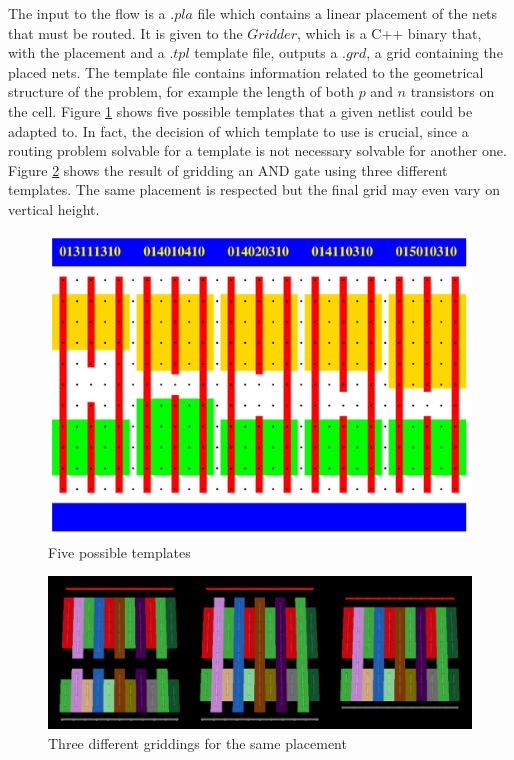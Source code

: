 The input to the flow is a $.pla$ file which contains a linear placement of the nets that must be routed. It is given to the $Gridder$, which is a C++ binary that, with the placement and a $.tpl$ template file, outputs a $.grd$, a grid containing the placed nets. The template file contains information related to the geometrical structure of the problem, for example the length of both $p$ and $n$ transistors on the cell. Figure \ref{fig:templates} shows five possible templates that a given netlist could be adapted to. In fact, the decision of which template to use is crucial, since a routing problem solvable for a template is not necessary solvable for another one. Figure \ref{fig:threetemplates} shows the result of gridding an AND gate using three different templates. The same placement is respected but the final grid may even vary on vertical height. \\


\begin{figure}[h!]
  \centering
  \includegraphics[scale=0.55]{img/design/templates.png}
  \caption{Five possible templates}
  \label{fig:templates}
\end{figure} 


\begin{figure}[h!]
  \centering
  \includegraphics[scale=0.35]{img/design/threetemplates.png}
  \caption{Three different griddings for the same placement}
  \label{fig:threetemplates}
\end{figure} 

